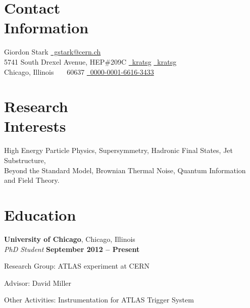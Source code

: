 \documentclass[margin,line]{resume}
\let\origsection\section%
\let\section\subsection%
\let\section\origsection%
\begin{document}
\begin{resume}

\section{\mysidestyle Contact\\Information}

Giordon Stark						\hfill \href{mailto:gstark@cern.ch}{~gstark@cern.ch}
\vspace{0mm}\\\vspace{0mm}%
5741 South Drexel Avenue, HEP\#209C \hfill \href{https://github.com/kratsg}{~kratsg} {\large\rmfamily\textbullet} \href{skype:kratsg?chat}{~kratsg}
\vspace{0mm}\\\vspace{0mm}%
Chicago, Illinois \ \ \ 60637    \hfill \href{https://orcid.org/0000-0001-6616-3433}{~0000-0001-6616-3433} \\
\vspace{-4.5mm}%

\section{\mysidestyle Research\\Interests}

High Energy Particle Physics, Supersymmetry, Hadronic Final States, Jet Substructure, \\
Beyond the Standard Model, Brownian Thermal Noise, Quantum Information and Field Theory.

    \section{\mysidestyle Education}

	\textbf{University of Chicago}, Chicago, Illinois \vspace{2mm}\\\vspace{1mm}%
	\textsl{PhD Student} \hfill \textbf{September 2012 -- Present}\vspace{-3mm}\\\vspace{-1mm}%
	\begin{list2}
		\item Research Group: ATLAS experiment at CERN
		\item Advisor: David Miller
		\item Other Activities: Instrumentation for ATLAS Trigger System
	\end{list2}\vspace{-1.5mm}


\end{resume}
\end{document}
